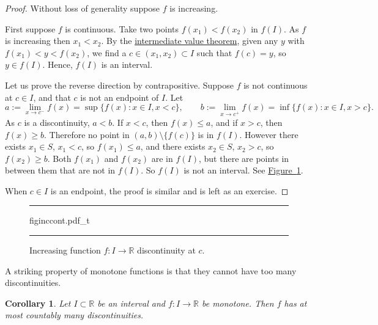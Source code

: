 \documentclass[12pt]{book}
\newenvironment{myfigureht}{%
\begin{figure}[h!t]
\noindent\rule{\textwidth}{0.4pt}\vspace{12pt}\par\centering}%
{\par\noindent\rule{\textwidth}{0.4pt}
\end{figure}}
\newcommand{\R}{{\mathbb{R}}}
\theoremstyle{plain}
\newtheorem{cor}[thm]{Corollary}
\theoremstyle{remark}
\theoremstyle{definition}
\theoremstyle{exercise}
\theoremstyle{example}
\newcommand{\figureref}[1]{\hyperref[#1]{Figure~\ref*{#1}}}
\begin{document}
\begin{proof}
Without loss of generality suppose $f$ is increasing.

First suppose $f$ is continuous.  Take two points
$f(x_1) < f(x_2)$ in $f(I)$.
As $f$ is increasing then $x_1 < x_2$.  By the
\hyperref[IVT:thm]{intermediate value theorem},
given any $y$ with $f(x_1) < y < f(x_2)$, we find
a $c \in (x_1,x_2) \subset I$ such that $f(c) = y$, so $y \in f(I)$. 
Hence, $f(I)$ is an interval.

Let us prove the reverse direction by contrapositive.
Suppose $f$ is not continuous at $c \in I$,
and that $c$ is not an endpoint of $I$.
Let
\begin{equation*}
a := \lim_{x \to c^-} f(x) = \sup \{ f(x) : x \in I, x < c \} ,
\qquad
b := \lim_{x \to c^+} f(x) = \inf \{ f(x) : x \in I, x > c \} .
\end{equation*}
As $c$ is a discontinuity, $a < b$.
If $x < c$, then $f(x) \leq a$, and
if $x > c$, then $f(x) \geq b$.  Therefore
no point
in $(a,b) \setminus \{ f(c) \}$ is in $f(I)$.
However there exists $x_1 \in S$, $x_1 < c$, so
$f(x_1) \leq a$, and there exists $x_2 \in S$, $x_2 > c$,
so $f(x_2) \geq b$.  Both $f(x_1)$ and $f(x_2)$ are in $f(I)$,
but there are points in between them that are not in $f(I)$.
So $f(I)$ is not an interval.  See \figureref{fig:figinccont}.

When $c \in I$ is an endpoint, the proof is similar and is left as an exercise.
\end{proof}

\begin{myfigureht}
{figinccont.pdf_t}
\caption{Increasing function $f \colon I \to \R$ discontinuity at
$c$.\label{fig:figinccont}}
\end{myfigureht}

A striking property of monotone functions is that they cannot have
too many discontinuities.

\begin{cor} \label{cor:monotcountcont}
Let $I \subset \R$ be an interval and
$f \colon I \to \R$ be monotone.  Then $f$ has at most
countably many discontinuities.
\end{cor}
\end{document}
